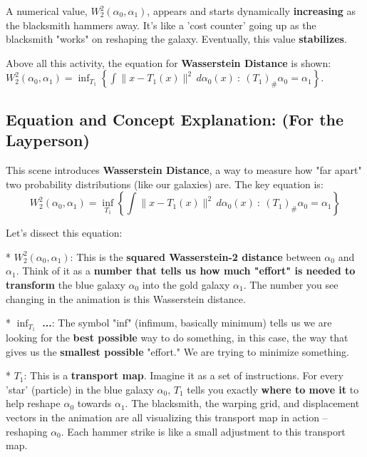 \documentclass{article}
\begin{document}
A numerical value, \textbf{\( W_2^2(\alpha_0, \alpha_1) \)}, appears and starts dynamically \textbf{increasing} as the blacksmith hammers away.  It's like a 'cost counter' going up as the blacksmith "works" on reshaping the galaxy. Eventually, this value \textbf{stabilizes}.

Above all this activity, the equation for \textbf{Wasserstein Distance} is shown: \( W_2^2(\alpha_0, \alpha_1) = \inf_{T_1} \left\{ \int \|x - T_1(x)\|^2 \, d\alpha_0(x) \ : \ (T_1)_\# \alpha_0 = \alpha_1 \right\} \).

\subsection*{Equation and Concept Explanation: (For the Layperson)}

This scene introduces \textbf{Wasserstein Distance}, a way to measure how "far apart" two probability distributions (like our galaxies) are.  The key equation is:
\[
W_2^2(\alpha_0, \alpha_1) = \inf_{T_1} \left\{ \int \|x - T_1(x)\|^2 \, d\alpha_0(x) \ : \ (T_1)_\# \alpha_0 = \alpha_1 \right\}
\]

Let's dissect this equation:

*   \textbf{\( W_2^2(\alpha_0, \alpha_1) \)}: This is the \textbf{squared Wasserstein-2 distance} between \( \alpha_0 \) and \( \alpha_1 \).  Think of it as a \textbf{number that tells us how much "effort" is needed to transform} the blue galaxy \( \alpha_0 \) into the gold galaxy \( \alpha_1 \). The number you see changing in the animation is this Wasserstein distance.

*   \textbf{\( \inf_{T_1} \) ...}: The symbol "inf" (infimum, basically minimum) tells us we are looking for the \textbf{best possible} way to do something, in this case, the way that gives us the \textbf{smallest possible} "effort." We are trying to minimize something.

*   \textbf{\( T_1 \)}: This is a \textbf{transport map}.  Imagine it as a set of instructions. For every 'star' (particle) in the blue galaxy \( \alpha_0 \), \( T_1 \) tells you exactly \textbf{where to move it} to help reshape \( \alpha_0 \) towards \( \alpha_1 \).  The blacksmith, the warping grid, and displacement vectors in the animation are all visualizing this transport map in action – reshaping \( \alpha_0 \).  Each hammer strike is like a small adjustment to this transport map.
\end{document}
